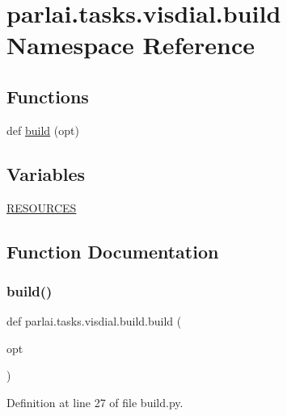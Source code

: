 \hypertarget{namespaceparlai_1_1tasks_1_1visdial_1_1build}{}\section{parlai.\+tasks.\+visdial.\+build Namespace Reference}
\label{namespaceparlai_1_1tasks_1_1visdial_1_1build}
\subsection*{Functions}
\begin{DoxyCompactItemize}
\item 
def \hyperlink{namespaceparlai_1_1tasks_1_1visdial_1_1build_a67068d01ede2596cbe1100e5f0896f3c}{build} (opt)
\end{DoxyCompactItemize}
\subsection*{Variables}
\begin{DoxyCompactItemize}
\item 
\hyperlink{namespaceparlai_1_1tasks_1_1visdial_1_1build_a4c7aca51f877fb6b3dc05ec99dd6eb72}{R\+E\+S\+O\+U\+R\+C\+ES}
\end{DoxyCompactItemize}


\subsection{Function Documentation}
\mbox{\label{namespaceparlai_1_1tasks_1_1visdial_1_1build_a67068d01ede2596cbe1100e5f0896f3c}} 
\subsubsection{\texorpdfstring{build()}{build()}}
{\footnotesize\ttfamily def parlai.\+tasks.\+visdial.\+build.\+build (\begin{DoxyParamCaption}\item[{}]{opt }\end{DoxyParamCaption})}



Definition at line 27 of file build.\+py.


